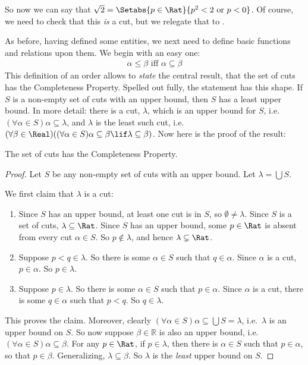 So now we can say that $\sqrt{2} = \Setabs{p \in \Rat}{p^2 < 2\text{
or }p < 0}$. Of course, we need to check that this \emph{is} a cut,
but we relegate that to .

As before, having defined some entities, we next need to define basic
functions and relations upon them. We begin with an easy one:
\begin{align*}
	\alpha \leq \beta \text{ iff }\alpha \subseteq \beta
\end{align*}
This definition of an order allows to \emph{state} the central result,
that the set of cuts has the Completeness Property. Spelled out fully,
the statement has this shape. If $S$ is a non-empty set of cuts with
an upper bound, then $S$ has a least upper bound. In more detail: there is a cut, $\lambda$, which is an upper bound for $S$, i.e.\ $(\forall \alpha \in S)\alpha \subseteq
\lambda$, and $\lambda$ is the least such cut, i.e.\ $(\forall \beta \in \Real)((\forall \alpha \in S)\alpha \subseteq \beta \lif \lambda \subseteq \beta)$. Now here is
the proof of the result:

\begin{thm}
The set of cuts has the Completeness Property. 
\end{thm}

\begin{proof}
Let $S$ be any non-empty set of cuts with an upper bound. Let $\lambda
= \bigcup S$. 

We first claim that $\lambda$ is a cut:
\begin{enumerate}
\item Since $S$ has an upper bound, at least one cut is in $S$, so
$\emptyset \neq \lambda$. Since $S$ is a set of cuts, $\lambda
\subseteq \Rat$. Since $S$ has an upper bound, some $p \in \Rat$ is
absent from every cut $\alpha \in S$. So $p\notin \lambda$, and hence
$\lambda \subsetneq \Rat$.
\item Suppose $p < q \in \lambda$. So there is some $\alpha \in S$
such that $q \in \alpha$. Since $\alpha$ is a cut, $p \in \alpha$. So
$p \in \lambda$.
\item Suppose $p \in \lambda$. So there is some $\alpha \in S$ such
that $p \in \alpha$. Since $\alpha$ is a cut, there is some $q \in
\alpha$ such that $p < q$. So $q \in \lambda$. 
\end{enumerate}
This proves the claim. Moreover, clearly $(\forall \alpha \in S)\alpha
\subseteq \bigcup S = \lambda$, i.e.\ $\lambda$ is an upper bound on $S$. So now suppose $\beta \in \mathbb{R}$ is also an upper bound, i.e.\ $(\forall \alpha \in S)\alpha \subseteq \beta$. For any $p \in \Rat$, if $p \in \lambda$, then there is $\alpha \in S$ such that $p \in \alpha$, so that $p \in \beta$. Generalizing, $\lambda \subseteq \beta$. So $\lambda$ is the \emph{least} upper bound on $S$.
\end{proof}

